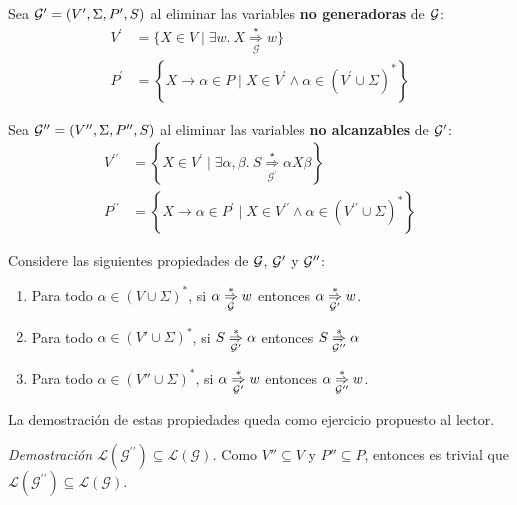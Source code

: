 Sea $\mathcal{G}' = (V', \Sigma, P', S)$ al eliminar las variables \textbf{no generadoras} de $\mathcal{G}$:
$$
    \begin{aligned}
        V^{\prime} & =\{X \in V \mid \exists w.\ X \underset{\mathcal{G}}{\stackrel{\star}{\Rightarrow}} w\}                                 \\
        P^{\prime} & =\left\{X \rightarrow \alpha \in P \mid X \in V^{\prime} \wedge \alpha \in\left(V^{\prime} \cup \Sigma\right)^*\right\}
    \end{aligned}
$$

Sea $\mathcal{G}'' = (V'', \Sigma, P'', S)$ al eliminar las variables \textbf{no alcanzables} de $\mathcal{G}'$:
$$
    \begin{aligned}
        V^{\prime \prime} & =\left\{X \in V^{\prime} \mid \exists \alpha, \beta.\ S \underset{\mathcal{G}^{\prime}}{\stackrel{\star}{\Rightarrow}} \alpha X \beta\right\}  \\
        P^{\prime \prime} & =\left\{X \rightarrow \alpha \in P^{\prime} \mid X \in V^{\prime \prime} \wedge \alpha \in\left(V^{\prime \prime} \cup \Sigma\right)^*\right\}
    \end{aligned}
$$

Considere las siguientes propiedades de $\mathcal{G}$, $\mathcal{G}'$ y $\mathcal{G}''$:
\begin{enumerate}
    \item Para todo $\alpha \in (V \cup \Sigma)^*$, si $\alpha \underset{\mathcal{G}}{\overset{*}{\Rightarrow}} w$ entonces $\alpha \underset{\mathcal{G}'}{\overset{*}{\Rightarrow}} w$.

    \item Para todo $\alpha \in (V' \cup \Sigma)^*$, si $S \underset{\mathcal{G}'}{\overset{*}{\Rightarrow}} \alpha$ entonces $S \underset{\mathcal{G}''}{\overset{*}{\Rightarrow}} \alpha$

    \item Para todo $\alpha \in (V'' \cup \Sigma)^*$, si $\alpha \underset{\mathcal{G}'}{\overset{*}{\Rightarrow}} w$ entonces $\alpha \underset{\mathcal{G}''}{\overset{*}{\Rightarrow}} w$.
\end{enumerate}

La demostración de estas propiedades queda como ejercicio propuesto al lector. \bigbreak

\textit{Demostración $\mathcal{L}\left(\mathcal{G}^{\prime \prime}\right) \subseteq \mathcal{L}(\mathcal{G})$.} Como $V'' \subseteq V$ y $P'' \subseteq P$, entonces es trivial que $\mathcal{L}\left(\mathcal{G}^{\prime \prime}\right) \subseteq \mathcal{L}(\mathcal{G})$. \bigbreak

